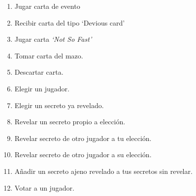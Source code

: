 \documentclass[12pt,a4paper]{article}
\begin{document}
\begin{enumerate}
  \item Jugar carta de evento
  \item Recibir carta del tipo `Devious card'
  \item Jugar carta \textit{`Not So Fast'}
  \item Tomar carta del mazo.
  \item Descartar carta.
  \item Elegir un jugador.
  \item Elegir un secreto ya revelado.
  \item Revelar un secreto propio a elección.
  \item Revelar secreto de otro jugador a tu elección.
  \item Revelar secreto de otro jugador a su elección.
  \item Añadir un secreto ajeno revelado a tus secretos sin revelar.
  \item Votar a un jugador.

\end{enumerate}
\end{document}
